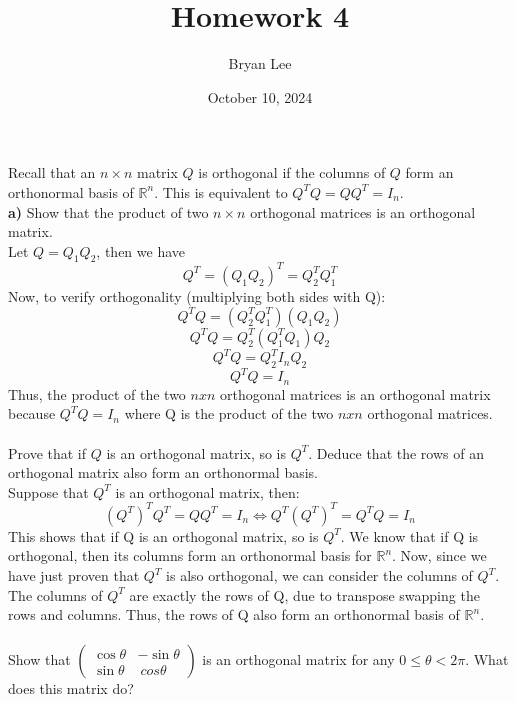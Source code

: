 \documentclass{article}
\title{Homework 4}
\author{Bryan Lee}
\date{October 10, 2024}
\begin{document}
\maketitle

 Recall that an $n \times n$ matrix $Q$ is orthogonal if the
columns of $Q$ form an orthonormal basis of $\mathbb{R}^n$. This is equivalent to
$Q^TQ = QQ^T = I_n$. \\
{\bf a)} Show that the product of two $n \times n$ orthogonal matrices is an
orthogonal matrix. \\

\noindent Let $Q = Q_1Q_2$, then we have
\[
Q^T = (Q_1Q_2)^T = Q_2^TQ_1^T
\]
Now, to verify orthogonality (multiplying both sides with Q):\\
\[
Q^TQ = (Q_2^TQ_1^T)(Q_1Q_2)
\]
\[
Q^TQ = Q_2^T(Q_1^TQ_1)Q_2
\]
\[
Q^TQ = Q_2^TI_nQ_2
\]
\[
Q^TQ = I_n
\]
Thus, the product of the two $nxn$ orthogonal matrices is an orthogonal matrix because $Q^TQ = I_n$ where Q is the product of the two $nxn$ orthogonal matrices.\\\\

 Prove that if $Q$ is an orthogonal matrix, so is $Q^T$. Deduce that the
rows of an orthogonal matrix also form an orthonormal basis. \\

\noindent Suppose that $Q^T$ is an orthogonal matrix, then:
\[
(Q^T)^TQ^T = QQ^T = I_n \Leftrightarrow Q^T(Q^T)^T = Q^TQ = I_n
\]
This shows that if Q is an orthogonal matrix, so is $Q^T$. We know that if Q is orthogonal, then its columns form an orthonormal basis for $\mathbb{R}^n$. Now, since we have just proven that $Q^T$ is also orthogonal, we can consider the columns of $Q^T$. The columns of $Q^T$ are exactly the rows of Q, due to transpose swapping the rows and columns. Thus, the rows of Q also form an orthonormal basis of $\mathbb{R}^n$.\\\\

 Show that $\begin{pmatrix} \cos \theta & - \sin \theta \\ \sin \theta & \
cos \theta \end{pmatrix}$ is an orthogonal matrix for any $0 \leq \theta < 2\pi$.
What does this matrix do? \\
\end{document}
